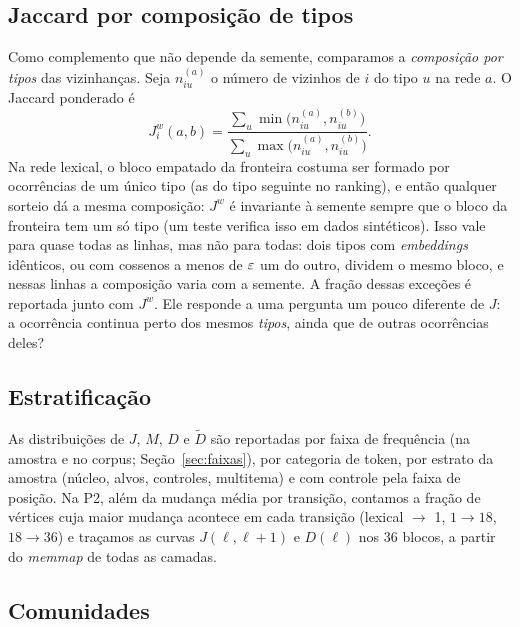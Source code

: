 \subsection{Jaccard por composição de tipos}\label{sec:met-jw}

Como complemento que não depende da semente, comparamos a \emph{composição por tipos} das
vizinhanças. Seja $n^{(a)}_{iu}$ o número de vizinhos de $i$ do tipo $u$ na rede $a$. O Jaccard
ponderado é
\begin{equation}
    J^{w}_i(a,b)=\frac{\sum_u \min\bigl(n^{(a)}_{iu},n^{(b)}_{iu}\bigr)}
                      {\sum_u \max\bigl(n^{(a)}_{iu},n^{(b)}_{iu}\bigr)}.
\end{equation}
Na rede lexical, o bloco empatado da fronteira costuma ser formado por ocorrências de um único
tipo (as do tipo seguinte no ranking), e então qualquer sorteio dá a mesma composição: $J^w$ é
invariante à semente sempre que o bloco da fronteira tem um só tipo (um teste verifica isso em
dados sintéticos). Isso vale para quase todas as linhas, mas não para todas: dois tipos com
\emph{embeddings} idênticos, ou com cossenos a menos de $\varepsilon$ um do outro, dividem o mesmo
bloco, e nessas linhas a composição varia com a semente. A fração dessas exceções é
reportada junto com $J^w$. Ele responde a uma pergunta um pouco
diferente de $J$: a ocorrência continua perto dos mesmos \emph{tipos}, ainda que de outras
ocorrências deles?

\subsection{Estratificação}\label{sec:met-estratos}

As distribuições de $J$, $M$, $D$ e $\tilde D$ são reportadas por faixa de frequência (na
amostra e no corpus; Seção~\ref{sec:faixas}), por categoria de token, por estrato da amostra
(núcleo, alvos, controles, multitema) e com controle pela faixa de posição. Na P2, além da
mudança média por transição, contamos a fração de vértices cuja maior mudança acontece em cada
transição (lexical $\to$ 1, $1\to18$, $18\to36$) e traçamos as curvas $J(\ell,\ell+1)$ e
$D(\ell)$ nos 36 blocos, a partir do \emph{memmap} de todas as camadas.

\subsection{Comunidades}\label{sec:met-comunidades}

